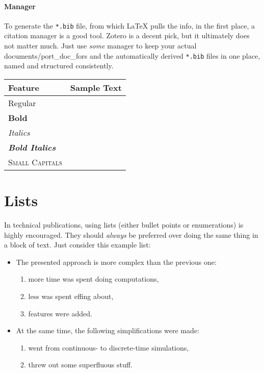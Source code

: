 \paragraph{Manager}
To generate the \texttt{*.bib} file, from which \LaTeX{} pulls the info, in the first place, a citation manager is a good tool.
Zotero is a decent pick, but it ultimately does not matter much.
Just use \emph{some} manager to keep your actual documents/\glspl{port_doc_for} and the automatically derived \texttt{*.bib} files in one place, named and structured consistently.
\begin{table}
	{%
		\sffamily
		\begin{tabular}{@{}ll@{}}%
		\toprule
			Feature & Sample Text\\
		\midrule
			Regular & \sampletext\\
			\textbf{Bold} & \textbf{\sampletext}\\
			\textit{Italics} & \textit{\sampletext}\\
			\textbf{\textit{Bold Italics}} & \textbf{\textit{\sampletext}}\\
			\textsc{Small Capitals} & \textsc{\sampletext}\\
		\bottomrule
		\end{tabular}
	}%
\end{table}
\section{Lists}
In technical publications, using lists (either bullet points or enumerations) is highly encouraged.
They should \emph{always} be preferred over doing the same thing in a block of text.
Just consider this example list:
\begin{itemize}
	\item The presented approach is more complex than the previous one:
	\begin{enumerate}
		\item more time was spent doing computations,
		\item less was spent effing about,
		\item features were added.
	\end{enumerate}
	\item At the same time, the following simplifications were made:
	\begin{enumerate}
		\item went from continuous- to discrete-time simulations,
		\item threw out some superfluous stuff.
	\end{enumerate}
\end{itemize}

